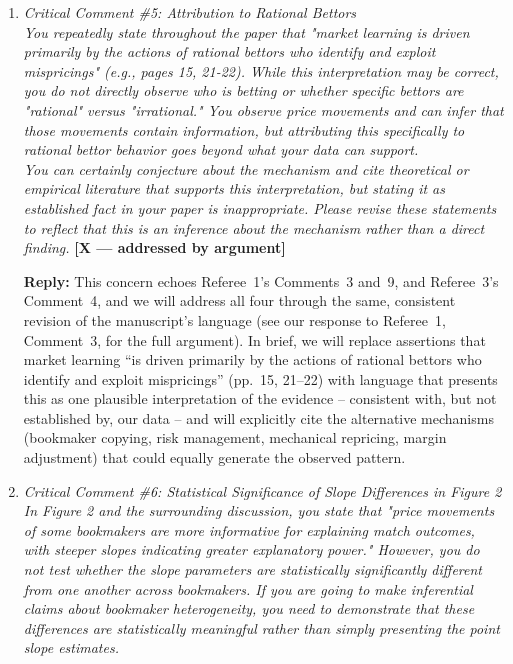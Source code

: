 \documentclass[letterpaper,12pt]{article}
\newcounter{b}
\newcommand{\argX}{\textcolor{green!55!black}{\textbf{[X --- addressed by argument]}}}
\newcommand{\Reply}[1]{\par\noindent\textbf{Reply:} #1}
\begin{document}
\begin{enumerate}
\item \textit{Critical Comment \#5: Attribution to Rational Bettors\\[6pt]
You repeatedly state throughout the paper that "market learning is driven primarily by the actions of rational bettors who identify and exploit mispricings" (e.g., pages 15, 21-22). While this interpretation may be correct, you do not directly observe who is betting or whether specific bettors are "rational" versus "irrational." You observe price movements and can infer that those movements contain information, but attributing this specifically to rational bettor behavior goes beyond what your data can support.\\[6pt]
You can certainly conjecture about the mechanism and cite theoretical or empirical literature that supports this interpretation, but stating it as established fact in your paper is inappropriate. Please revise these statements to reflect that this is an inference about the mechanism rather than a direct finding.} \argX

\Reply{This concern echoes Referee~1's Comments~3 and~9, and Referee~3's Comment~4, and we will address all four through the same, consistent revision of the manuscript's language (see our response to Referee~1, Comment~3, for the full argument). In brief, we will replace assertions that market learning ``is driven primarily by the actions of rational bettors who identify and exploit mispricings'' (pp.~15, 21--22) with language that presents this as one plausible interpretation of the evidence -- consistent with, but not established by, our data -- and will explicitly cite the alternative mechanisms (bookmaker copying, risk management, mechanical repricing, margin adjustment) that could equally generate the observed pattern.}

\item \textit{Critical Comment \#6: Statistical Significance of Slope Differences in Figure 2\\[6pt]
In Figure 2 and the surrounding discussion, you state that "price movements of some bookmakers are more informative for explaining match outcomes, with steeper slopes indicating greater explanatory power." However, you do not test whether the slope parameters are statistically significantly different from one another across bookmakers. If you are going to make inferential claims about bookmaker heterogeneity, you need to demonstrate that these differences are statistically meaningful rather than simply presenting the point slope estimates.}


\end{enumerate}
\end{document}
